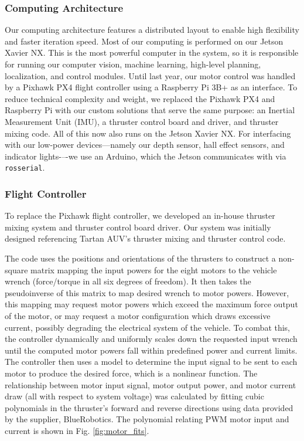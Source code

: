 \documentclass[conference]{IEEEtran}
\begin{document}
\subsubsection{Computing Architecture}
\label{sssec:comp_arch}
Our computing architecture features a distributed layout to enable high flexibility and faster iteration speed. Most of our computing is performed on our Jetson Xavier NX. This is the most powerful computer in the system, so it is responsible for running our computer vision, machine learning, high-level planning, localization, and control modules. Until last year, our motor control was handled by a Pixhawk PX4 flight controller using a Raspberry Pi 3B+ as an interface. To reduce technical complexity and weight, we replaced the Pixhawk PX4 and Raspberry Pi with our custom solutions that serve the same purpose: an Inertial Measurement Unit (IMU), a thruster control board and driver, and thruster mixing code. All of this now also runs on the Jetson Xavier NX. For interfacing with our low-power devices---namely our depth sensor, hall effect sensors, and indicator lights-–-we use an Arduino, which the Jetson communicates with via \verb|rosserial|.

\subsubsection{Flight Controller}
\label{sssec:flight_controller}
To replace the Pixhawk flight controller, we developed an in-house thruster mixing system and thruster control board driver. Our system was initially designed referencing Tartan AUV's thruster mixing and thruster control code.

The code uses the positions and orientations of the thrusters to construct a non-square matrix mapping the input powers for the eight motors to the vehicle wrench (force/torque in all six degrees of freedom). It then takes the pseudoinverse of this matrix to map desired wrench to motor powers. However, this mapping may request motor powers which exceed the maximum force output of the motor, or may request a motor configuration which draws excessive current, possibly degrading the electrical system of the vehicle. To combat this, the controller dynamically and uniformly scales down the requested input wrench until the computed motor powers fall within predefined power and current limits. The controller then uses a model to determine the input signal to be sent to each motor to produce the desired force, which is a nonlinear function. The relationship between motor input signal, motor output power, and motor current draw (all with respect to system voltage) was calculated by fitting cubic polynomials in the thruster's forward and reverse directions using data provided by the supplier, BlueRobotics. The polynomial relating PWM motor input and current is shown in Fig. \ref{fig:motor_fits}.
\end{document}
